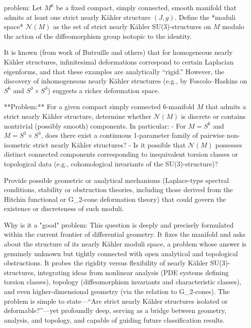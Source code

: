 problem:  
Let \(M^6\) be a fixed compact, simply connected, smooth manifold that admits at least one strict nearly Kähler structure \((J, g)\).  
Define the *moduli space* \(\mathcal{N}(M)\) as the set of strict nearly Kähler SU(3)-structures on \(M\) modulo the action of the diffeomorphism group isotopic to the identity.  

It is known (from work of Butruille and others) that for homogeneous nearly Kähler structures, infinitesimal deformations correspond to certain Laplacian eigenforms, and that these examples are analytically “rigid.” However, the discovery of inhomogeneous nearly Kähler structures (e.g., by Foscolo–Haskins on \(S^6\) and \(S^3\times S^3\)) suggests a richer deformation space.  

**Problem:**  
For a given compact simply connected \(6\)-manifold \(M\) that admits a strict nearly Kähler structure, determine whether \(\mathcal{N}(M)\) is discrete or contains nontrivial (possibly smooth) components. In particular:  
- For \(M = S^6\) and \(M = S^3\times S^3\), does there exist a continuous 1-parameter family of pairwise non-isometric strict nearly Kähler structures?  
- Is it possible that \(\mathcal{N}(M)\) possesses distinct connected components corresponding to inequivalent torsion classes or topological data (e.g., cohomological invariants of the SU(3)-structure)?  

Provide possible geometric or analytical mechanisms (Laplace-type spectral conditions, stability or obstruction theories, including those derived from the Hitchin functional or G_2-cone deformation theory) that could govern the existence or discreteness of such moduli.

Why is it a "good" problem:  
This question is deeply and precisely formulated within the current frontier of differential geometry. It fixes the manifold and asks about the structure of its nearly Kähler moduli space, a problem whose answer is genuinely unknown but tightly connected with open analytical and topological obstructions. It probes the rigidity versus flexibility of nearly Kähler SU(3)-structures, integrating ideas from nonlinear analysis (PDE systems defining torsion classes), topology (diffeomorphism invariants and characteristic classes), and even higher-dimensional geometry (via the relation to G_2-cones). The problem is simple to state—“Are strict nearly Kähler structures isolated or deformable?”—yet profoundly deep, serving as a bridge between geometry, analysis, and topology, and capable of guiding future classification results.
